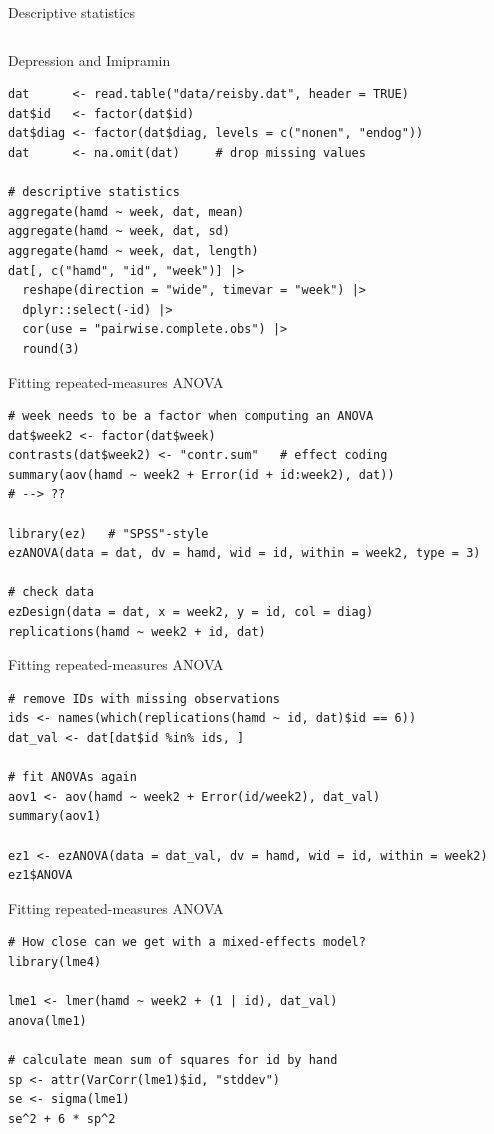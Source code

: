 \documentclass[aspectratio=169]{beamer}
\begin{document}
\begin{frame}{Descriptive statistics}
\begin{columns}
\begin{column}{.6\textwidth}
  \vspace{1cm}
\end{column}
\end{columns}
\end{frame}

\begin{frame}[fragile]{Depression and Imipramin}
  \begin{lstlisting}
dat      <- read.table("data/reisby.dat", header = TRUE)
dat$id   <- factor(dat$id)
dat$diag <- factor(dat$diag, levels = c("nonen", "endog"))
dat      <- na.omit(dat)     # drop missing values

# descriptive statistics
aggregate(hamd ~ week, dat, mean)
aggregate(hamd ~ week, dat, sd)
aggregate(hamd ~ week, dat, length)
dat[, c("hamd", "id", "week")] |>
  reshape(direction = "wide", timevar = "week") |>
  dplyr::select(-id) |>
  cor(use = "pairwise.complete.obs") |>
  round(3)
  \end{lstlisting}
\end{frame}

\begin{frame}[fragile]{Fitting repeated-measures ANOVA}
  \begin{lstlisting}
# week needs to be a factor when computing an ANOVA
dat$week2 <- factor(dat$week)
contrasts(dat$week2) <- "contr.sum"   # effect coding
summary(aov(hamd ~ week2 + Error(id + id:week2), dat))
# --> ??

library(ez)   # "SPSS"-style
ezANOVA(data = dat, dv = hamd, wid = id, within = week2, type = 3)

# check data
ezDesign(data = dat, x = week2, y = id, col = diag)
replications(hamd ~ week2 + id, dat)
  \end{lstlisting}
\end{frame}

\begin{frame}[fragile]{Fitting repeated-measures ANOVA}
  \begin{lstlisting}
# remove IDs with missing observations
ids <- names(which(replications(hamd ~ id, dat)$id == 6))
dat_val <- dat[dat$id %in% ids, ]

# fit ANOVAs again
aov1 <- aov(hamd ~ week2 + Error(id/week2), dat_val)
summary(aov1)

ez1 <- ezANOVA(data = dat_val, dv = hamd, wid = id, within = week2)
ez1$ANOVA
  \end{lstlisting}
\end{frame}

\begin{frame}[fragile]{Fitting repeated-measures ANOVA}
  \begin{lstlisting}
# How close can we get with a mixed-effects model?
library(lme4)

lme1 <- lmer(hamd ~ week2 + (1 | id), dat_val)
anova(lme1)

# calculate mean sum of squares for id by hand
sp <- attr(VarCorr(lme1)$id, "stddev")
se <- sigma(lme1)
se^2 + 6 * sp^2
  \end{lstlisting}
\end{frame}
\end{document}
